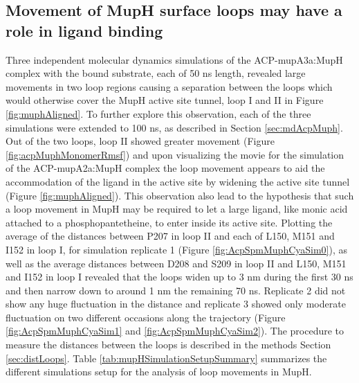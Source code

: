 \newpage		
	\subsection{Movement of MupH surface loops may have a role in ligand binding}
	\label{sec:loopMovement}
	Three independent molecular dynamics simulations of the ACP-mupA3a:MupH complex with the bound substrate, each of 50 ns length, revealed large movements in two loop regions causing a separation between the loops which would otherwise cover the MupH active site tunnel, loop I and II in Figure \ref{fig:muphAligned}. To further explore this observation, each of the three simulations were extended to 100 ns, as described in Section \ref{sec:mdAcpMuph}. Out of the two loops, loop II showed greater movement (Figure \ref{fig:acpMuphMonomerRmsf}) and upon visualizing the movie for the simulation of the ACP-mupA2a:MupH complex the loop movement appears to aid the accommodation of the ligand in the active site by widening the active site tunnel (Figure \ref{fig:muphAligned}). This observation also lead to the hypothesis that such a loop movement in MupH may be required to let a large ligand, like monic acid attached to a phosphopantetheine, to enter inside its active site. Plotting the average of the distances between P207 in loop II and each of L150, M151 and I152 in loop I, for simulation replicate 1 (Figure \ref{fig:AcpSpmMuphCyaSim0}), as well as the average distances between D208 and S209 in loop II and L150, M151 and I152 in loop I %
	revealed that the loops widen up to 3 nm during the first 30 ns and then narrow down to around 1 nm the remaining 70 ns. Replicate 2 did not show any huge fluctuation in the distance and replicate 3 showed only moderate fluctuation on two different occasions along the trajectory (Figure \ref{fig:AcpSpmMuphCyaSim1} and \ref{fig:AcpSpmMuphCyaSim2}). The procedure to measure the distances between the loops is described in the methods Section \ref{sec:distLoops}. Table \ref{tab:mupHSimulationSetupSummary} summarizes the different simulations setup for the analysis of loop movements in MupH.

	
	
